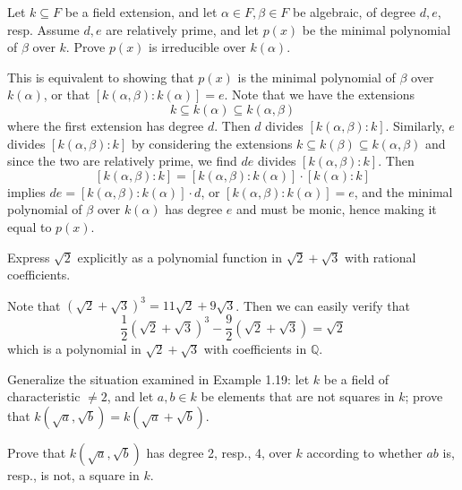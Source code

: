 \documentclass[../../master.tex]{subfiles}
\begin{document}
\begin{problem}
    Let $k \subseteq F$ be a field extension, and let $\alpha \in F, \beta \in F$ be algebraic, of degree $d, e$, resp.
    Assume $d, e$ are relatively prime, and let $p(x)$ be the minimal polynomial of $\beta$ over $k$.
    Prove $p(x)$ is irreducible over $k(\alpha)$.
\end{problem}

\begin{solution}
    This is equivalent to showing that $p(x)$ is the minimal polynomial of $\beta$ over $k(\alpha)$, or that $[k(\alpha, \beta) : k(\alpha)] = e$.
    Note that we have the extensions
    \[
        k \subseteq k(\alpha) \subseteq k(\alpha, \beta)
    \]
    where the first extension has degree $d$.
    Then $d$ divides $[k(\alpha, \beta) : k]$.
    Similarly, $e$ divides $[k(\alpha, \beta) : k]$ by considering the extensions $k \subseteq k(\beta) \subseteq k(\alpha, \beta)$ and since the two are relatively prime, we find $de$ divides $[k(\alpha, \beta) : k]$.
    Then
    \[
        [k(\alpha, \beta) : k] = [k(\alpha, \beta) : k(\alpha)] \cdot [k(\alpha) : k] 
    \]
    implies $de = [k(\alpha, \beta) : k(\alpha)] \cdot d$, or $[k(\alpha, \beta) : k(\alpha)] = e$, and the minimal polynomial of $\beta$ over $k(\alpha)$ has degree $e$ and must be monic, hence making it equal to $p(x)$.
\end{solution}

\begin{problem}
    Express $\sqrt{2}$ explicitly as a polynomial function in $\sqrt{2} + \sqrt{3}$ with rational coefficients.
\end{problem}

\begin{solution}
    Note that $(\sqrt{2} + \sqrt{3})^3 = 11\sqrt{2} + 9\sqrt{3}$.
    Then we can easily verify that
    \[
        \frac{1}{2} (\sqrt{2} + \sqrt{3})^3 - \frac{9}{2} (\sqrt{2} + \sqrt{3}) = \sqrt{2}
    \]
    which is a polynomial in $\sqrt{2} + \sqrt{3}$ with coefficients in $\mathbb{Q}$.
\end{solution}

\begin{problem}
    Generalize the situation examined in Example 1.19:
    let $k$ be a field of characteristic $\neq 2$, and let $a, b \in k$ be elements that are not squares in $k$;
    prove that $k(\sqrt{a}, \sqrt{b}) = k(\sqrt{a} + \sqrt{b})$.

    Prove that $k(\sqrt{a}, \sqrt{b})$ has degree 2, resp., 4, over $k$ according to whether $ab$ is, resp., is not, a square in $k$.
\end{problem}
\end{document}

